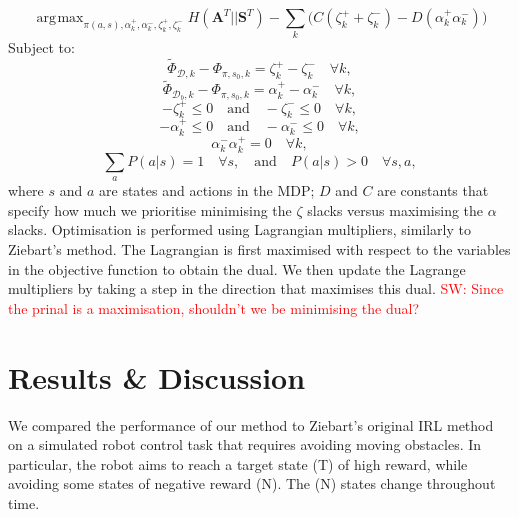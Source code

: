 \documentclass[conference]{IEEEtran}
\DeclareMathOperator*{\argmax}{\arg\!\max}
\newcommand{\sw}[1]{\textcolor{red}{SW: #1}}
\begin{document}
	\begin{equation*}
	\argmax_{\pi(a,s),\alpha^+_k ,\alpha^-_k ,\zeta^+_k, \zeta^-_k} H(\mathbf{A}^T||\mathbf{S}^T) - \sum_k\big(C(\zeta^+_k + \zeta^-_k)  -D(\alpha^+_k  \alpha^-_k)\big)
\end{equation*}
Subject to:
\begin{equation*}
  \widetilde{\Phi}_{\mathcal{D},k}-\Phi_{\pi,s_0,k}   = \zeta^+_k  - \zeta^-_k \quad \forall k, \label{eq:good_ineq}
\end{equation*}
\begin{equation*}
	\widetilde{\Phi}_{\mathcal{D}_b,k}-\Phi_{\pi,s_0,k}  = \alpha^+_k-\alpha^-_k \quad \forall k, \label{eq:bad_ineq}
\end{equation*}
\begin{equation*}
	-\zeta^+_k \leq 0 \quad \text{and} \quad -\zeta^-_k \leq 0 \quad \forall k,
\end{equation*}
\begin{equation*}
	-\alpha^+_k \leq 0 \quad \text{and} \quad -\alpha^-_k \leq 0 \quad \forall k,
\end{equation*}
\begin{equation*}
	\alpha^-_k \alpha^+_k = 0 \quad \forall k,  \label{eq:quadratic}
\end{equation*}
\begin{equation*}
\sum_aP(a|s)  = 1 \quad \forall s,   \quad \text{and} \quad P(a|s)  > 0 \quad \forall s,a,  
\end{equation*}
where $s$ and $a$ are states and actions in the MDP; $D$ and $C$ are constants that specify how much we prioritise minimising the $\zeta$ slacks versus maximising the $\alpha$ slacks. Optimisation is performed using Lagrangian multipliers, similarly to Ziebart's method. The Lagrangian is first maximised with respect to the variables in the objective function to obtain the dual. We then update the Lagrange multipliers by taking a step in the direction that maximises this dual. \sw{Since the prinal is a maximisation, shouldn't we be minimising the dual?}

\section{Results \& Discussion}

We compared the performance of our method to Ziebart's original IRL method on a simulated robot control task that requires avoiding moving obstacles.  In particular, the robot aims to reach a target state (T) of high reward,
while avoiding some states of negative reward (N). The (N) states change throughout time.
 
\end{document}
